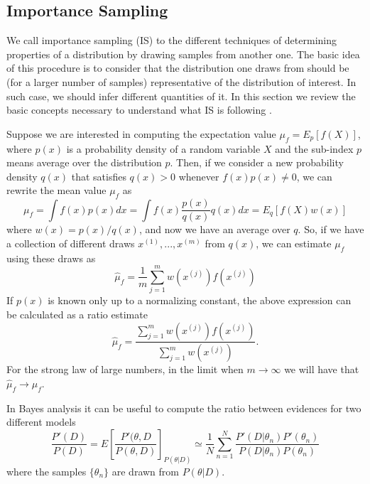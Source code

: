 \documentclass[onecolumn,           %
               showpacs,            %
               preprintnumbers,     %
               aps,                 %
               letterpaper,             %
               superscriptaddress,      %
               nofootinbib,         %
               tightenlines,        %
               floats,floatfix      %
               ,usenatbib,
               ]{revtex4-1}
\begin{document}
\subsection{Importance Sampling}

We call importance sampling (IS) to the different techniques of determining properties of a distribution by drawing samples from another one. The basic idea of this procedure is to consider that the distribution one draws from should be (for a larger number of samples) representative of the distribution of interest. In such case, we should infer different quantities of it. In this section we review the basic concepts necessary to understand what IS is following \cite{importancesampling}.

Suppose we are interested in computing the expectation value $\mu_f=E_p[f(X)]$, where $p(x)$ is a probability density of a random variable $X$ and the sub-index $p$ means average over the distribution $p$. Then, if we consider a new probability density $q(x)$ that satisfies $q(x)>0$ whenever $f(x)p(x)\not = 0$, we can rewrite the mean value $\mu_f$ as
\begin{equation}
\mu_f = \int f(x)p(x)dx=\int f(x)\frac{p(x)}{q(x)}q(x)dx=E_q[f(X)w(x)]
\end{equation}
where $w(x)=p(x)/q(x)$, and now we have an average over $q$. So, if we have a collection of different draws $x^{(1)},...,x^{(m)}$ from $q(x)$, we can estimate $\mu_f$ using these draws as
\begin{equation}
\hat \mu_f = \frac{1}{m}\sum_{j=1}^m w(x^{(j)})f(x^{(j)})
\end{equation}
If $p(x)$ is known only up to a normalizing constant, the above expression can be calculated  as a ratio estimate
\begin{equation}
\hat \mu_f=\frac{\sum_{j=1}^m w(x^{(j)})f(x^{(j)})}{\sum_{j=1}^mw(x^{(j)})}.
\end{equation}
For the strong law of large numbers, in the limit when $m\rightarrow \infty$ we will have that $\hat \mu_f\rightarrow \mu_f$.

In Bayes analysis it can be useful to compute the ratio between evidences for two different models
\begin{equation}\label{importanceratio}
\frac{P'(D)}{P(D)}=E\left[\frac{P'(\theta,D}{P(\theta,D)}\right]_{P(\theta|D)}\simeq \frac{1}{N}\sum_{n=1}^N\frac{P'(D|\theta_n)P'(\theta_n)}{P(D|\theta_n)P(\theta_n)}
\end{equation}
where the samples $\lbrace\theta_n\rbrace$ are drawn from $P(\theta|D)$.
\end{document}
